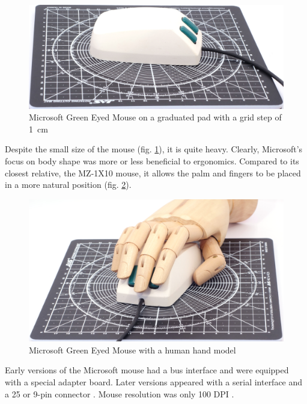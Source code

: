 \documentclass[11pt, a4paper]{article}
\begin{document}
\begin{figure}[h]
    \centering
    \includegraphics[scale=0.5]{1983_microsoft_green_eyed_mouse/size_30.jpg}
    \caption{Microsoft Green Eyed Mouse on a graduated pad with a grid step of 1~cm}
    \label{fig:MicrosoftGreenEyedSize}
\end{figure}

Despite the small size of the mouse (fig. \ref{fig:MicrosoftGreenEyedSize}), it is quite heavy. Clearly, Microsoft's focus on body shape was more or less beneficial to ergonomics. Compared to its closest relative, the MZ-1X10 mouse, it allows the palm and fingers to be placed in a more natural position (fig. \ref{fig:MicrosoftGreenEyedHand}).

\begin{figure}[h]
    \centering
    \includegraphics[scale=0.5]{1983_microsoft_green_eyed_mouse/hand_30.jpg}
    \caption{Microsoft Green Eyed Mouse with a human hand model}
    \label{fig:MicrosoftGreenEyedHand}
\end{figure}

Early versions of the Microsoft mouse had a bus interface and were equipped with a special adapter board. Later versions appeared with a serial interface and a 25 or 9-pin connector \cite{mouses}. Mouse resolution was only 100 DPI \cite{review}.
\end{document}
